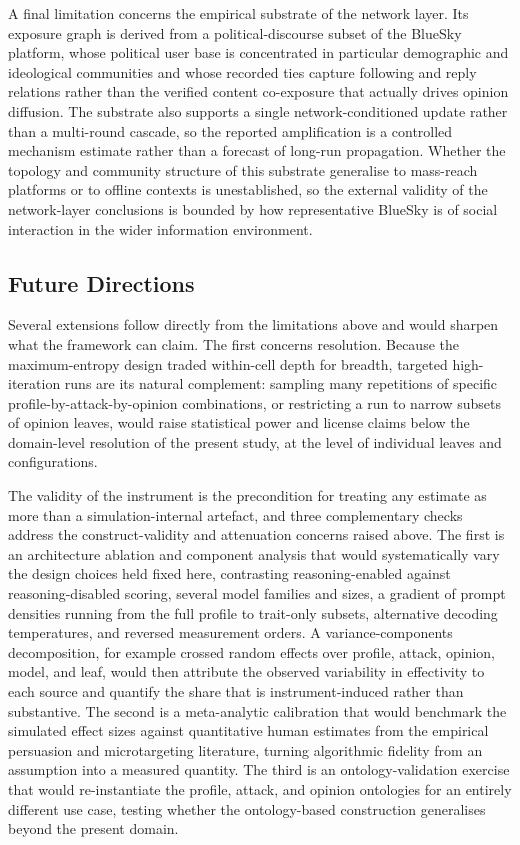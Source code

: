 \documentclass[11pt,a4paper]{article}
\begin{document}
A final limitation concerns the empirical substrate of the network layer. Its exposure graph is
derived from a political-discourse subset of the BlueSky platform, whose political user base is
concentrated in particular demographic and ideological communities and whose recorded ties
capture following and reply relations rather than the verified content co-exposure that actually
drives opinion diffusion. The substrate also supports a single network-conditioned update rather
than a multi-round cascade, so the reported amplification is a controlled mechanism estimate
rather than a forecast of long-run propagation. Whether the topology and community structure of
this substrate generalise to mass-reach platforms or to offline contexts is unestablished, so
the external validity of the network-layer conclusions is bounded by how representative BlueSky
is of social interaction in the wider information environment.

\subsection{Future Directions}

Several extensions follow directly from the limitations above and would sharpen what the framework
can claim. The first concerns resolution. Because the maximum-entropy design traded within-cell
depth for breadth, targeted high-iteration runs are its natural complement: sampling many
repetitions of specific profile-by-attack-by-opinion combinations, or restricting a run to narrow
subsets of opinion leaves, would raise statistical power and license claims below the domain-level
resolution of the present study, at the level of individual leaves and configurations.

The validity of the instrument is the precondition for treating any estimate as more than a
simulation-internal artefact, and three complementary checks address the construct-validity and
attenuation concerns raised above. The first is an architecture ablation and component analysis
that would systematically vary the design choices held fixed here, contrasting reasoning-enabled
against reasoning-disabled scoring, several model families and sizes, a gradient of prompt
densities running from the full profile to trait-only subsets, alternative decoding temperatures,
and reversed measurement orders. A variance-components decomposition, for example crossed random
effects over profile, attack, opinion, model, and leaf, would then attribute the observed
variability in effectivity to each source and quantify the share that is instrument-induced rather
than substantive. The second is a meta-analytic calibration that would benchmark the simulated
effect sizes against quantitative human estimates from the empirical persuasion and microtargeting
literature, turning algorithmic fidelity from an assumption into a measured quantity. The third is
an ontology-validation exercise that would re-instantiate the profile, attack, and opinion
ontologies for an entirely different use case, testing whether the ontology-based construction
generalises beyond the present domain.
\end{document}
